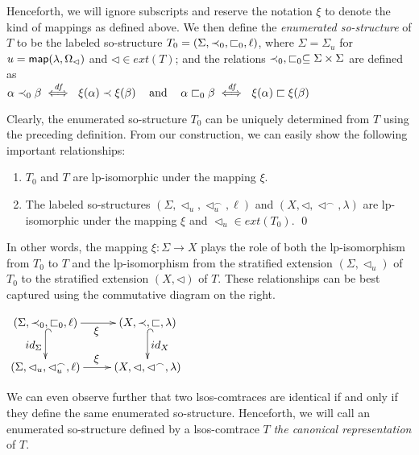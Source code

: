 \documentclass{llncs}
\begin{document}
Henceforth, we will ignore subscripts and reserve  the notation $\xi$  to denote the kind of mappings as defined above. We then define the \emph{enumerated so-structure} of $T$ to be the labeled so-structure $T_{0}=(\Sigma,\prec_{0},\sqsubset_{0},\ell)$, where $\Sigma = \Sigma_{u}$ for $u=\mathsf{map}(\lambda,\Omega_{\lhd})$ and $\lhd\in ext(T)$;  and the relations $\prec_{0},\sqsubset_{0}\subseteq \Sigma \times \Sigma$ are defined as\\
\mbox{\hspace{1.6cm}}$\alpha \prec_{0} \beta \stackrel{\textit{\scriptsize{df}}}{\iff}\  \xi(\alpha) \prec \xi(\beta)
\hspace*{3mm}\text{ and }\hspace*{3mm}
\alpha \sqsubset_{0} \beta \stackrel{\textit{\scriptsize{df}}}{\iff}\  \xi(\alpha) \sqsubset \xi(\beta)
$

Clearly, the  enumerated so-structure $T_0$ can be uniquely determined from $T$ using the preceding definition.  From our construction, we can easily show the following important relationships:

\begin{proposition} 
\begin{enumerate}
\item $T_{0}$ and $T$ are  lp-isomorphic under the mapping $\xi$. 
\item The labeled so-structures  $(\Sigma,\lhd_u,\lhd_u^{\frown},\ell)$ and $(X,\lhd,\lhd^{\frown},\lambda)$ are lp-isomorphic under the mapping $\xi$ and $\lhd_u\in ext(T_{0})$. \qed 
\end{enumerate} 
\label{prop:isoExt}
\end{proposition}
\begin{minipage}{7.2cm}
\hspace{0.5cm}In other words, the mapping $\xi:\Sigma\rightarrow X$ plays 
the role of both the lp-isomorphism from $T_{0}$ to $T$ and the lp-isomorphism from the stratified extension $(\Sigma,\lhd_{u})$ of $T_{0}$ to the stratified extension $(X,\lhd)$ of $T$. These relationships can be best captured using the commutative diagram on the right.\smallskip
\end{minipage}
\begin{minipage}{4.5cm}\centering\small\vspace{-3mm}
$\xymatrix{
 (\Sigma,\PO_{0},\sq_{0},\ell) \ar@{->}[r]_{\displaystyle \xi } \ar@{^{(}->}[d]_{\displaystyle id_{\Sigma}}
      & (X,\PO,\sq,\lambda) \ar@{^{(}->}[d]^{\displaystyle id_{X}}
   \\ 
 (\Sigma,\lhd_{u},\lhd_{u}^{\frown},\ell) \ar@{->}[r]^{\displaystyle \xi} &  (X,\lhd,\lhd^{\frown},\lambda)}$
 \end{minipage}

We can even observe further that two lsos-comtraces are identical if and only if they define the same enumerated so-structure. Henceforth, we will call an enumerated so-structure defined by a lsos-comtrace $T$ \emph{the canonical representation} of $T$. 
\end{document}

